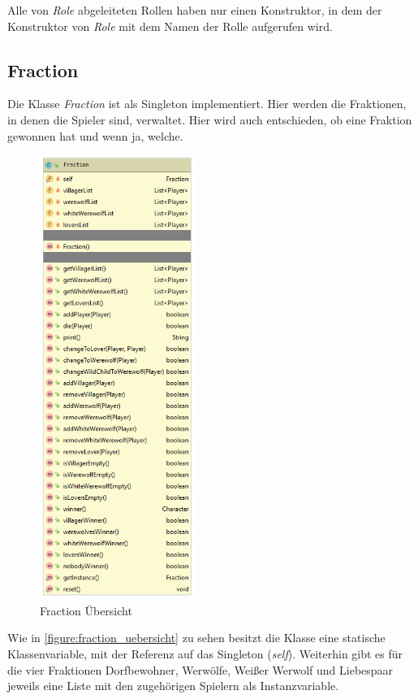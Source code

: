 \medskip
Alle von \textit{Role} abgeleiteten Rollen haben nur einen Konstruktor, in dem der Konstruktor von \textit{Role} mit dem Namen der Rolle aufgerufen wird. 

\subsection{Fraction}

Die Klasse \textit{Fraction} ist als Singleton implementiert. 
Hier werden die Fraktionen, in denen die Spieler sind, verwaltet. 
Hier wird auch entschieden, ob eine Fraktion gewonnen hat und wenn ja, welche. 

\begin{figure}[H]
	\centering
	\includegraphics[width=0.45\textwidth]{architektur/fraction_uml.png}
	\caption{Fraction Übersicht}
	\label{figure:fraction_uebersicht}
\end{figure}

Wie in \autoref{figure:fraction_uebersicht} zu sehen besitzt die Klasse eine statische Klassenvariable, mit der Referenz auf das Singleton (\textit{self}). 
Weiterhin gibt es für die vier Fraktionen Dorfbewohner, Werwölfe, Weißer Werwolf und Liebespaar jeweils eine Liste mit den zugehörigen Spielern als Instanzvariable. 

